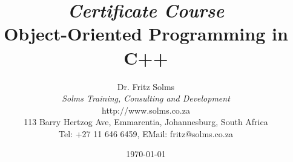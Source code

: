 \documentclass[11pt,a4paper,makeidx]{book}
\begin{document}




\newenvironment{exercises}
  {\begin{list}
     {E:\arabic{chapter}.\arabic{exercises}}
     {\usecounter{exercises} \setlength{\labelwidth}{1.2cm}
      \setlength{\labelsep}{0.3cm}\setlength{\leftmargin}{1.3cm}
      \setlength{\rightmargin}{0.2cm}}}
  {\end{list}}

\newenvironment{example}[0]{\stepcounter{exampl}
  \begin{center}\begin{tabular}{p{10cm}} \hline
  \\
  \end{tabular}\end{center}
     \noindent {\bf Example
\arabic{chapter}.\arabic{section}.\arabic{exampl}}}
{  \begin{center}\begin{tabular}{p{10cm}} \hline
   \\
  \end{tabular}\end{center}
}

\newcommand{\notrightarrow}{\; ! \! \rightarrow}



\title{{\em Certificate Course} \\ {\bf Object-Oriented Programming in C++}}
\author{{\large Dr. Fritz Solms} \\
        {\LARGE \em Solms Training, Consulting and Development} \\
        http://www.solms.co.za \\
        113 Barry Hertzog Ave, Emmarentia, Johannesburg, South Africa \\
        Tel: +27 11 646 6459, EMail: fritz@solms.co.za}

\date{\today}

\maketitle


\tableofcontents
\end{document}
